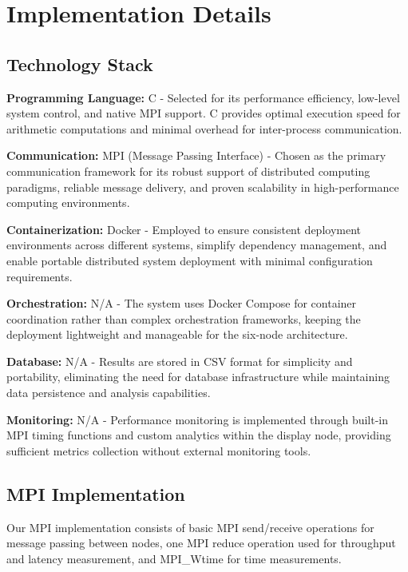 \documentclass{article}
\begin{document}
\section{Implementation Details}

\subsection{Technology Stack}

\textbf{Programming Language:} C - Selected for its performance efficiency, low-level system control, and native MPI support. C provides optimal execution speed for arithmetic computations and minimal overhead for inter-process communication.

\textbf{Communication:} MPI (Message Passing Interface) - Chosen as the primary communication framework for its robust support of distributed computing paradigms, reliable message delivery, and proven scalability in high-performance computing environments.

\textbf{Containerization:} Docker - Employed to ensure consistent deployment environments across different systems, simplify dependency management, and enable portable distributed system deployment with minimal configuration requirements.

\textbf{Orchestration:} N/A - The system uses Docker Compose for container coordination rather than complex orchestration frameworks, keeping the deployment lightweight and manageable for the six-node architecture.

\textbf{Database:} N/A - Results are stored in CSV format for simplicity and portability, eliminating the need for database infrastructure while maintaining data persistence and analysis capabilities.

\textbf{Monitoring:} N/A - Performance monitoring is implemented through built-in MPI timing functions and custom analytics within the display node, providing sufficient metrics collection without external monitoring tools.


\subsection{MPI Implementation}
Our MPI implementation consists of basic MPI send/receive operations for message passing between nodes, one MPI reduce operation used for throughput and latency measurement, and MPI\_Wtime for time measurements.
\end{document}
